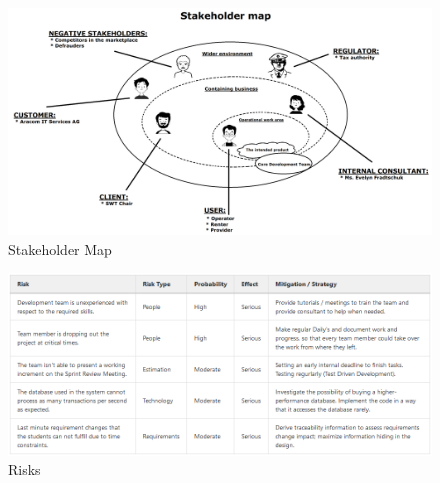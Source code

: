 \begin{figure}[h]
	\centering
	\includegraphics[width=12cm]{resources/images/stakeholder_map.png}
	\caption{Stakeholder Map}
	\label{fig:stakeholder_map}
\end{figure}

\begin{figure}[h]
	\centering
	\includegraphics[width=15cm]{resources/images/risks.png}
	\caption{Risks}
	\label{fig:risks}
\end{figure}